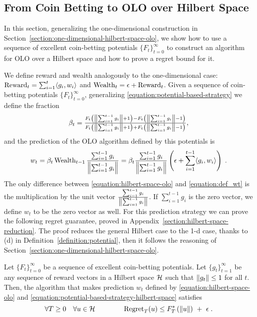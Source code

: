 \subsection{From Coin Betting to OLO over Hilbert Space}
\label{section:reduction_hilbert}

In this section, generalizing the one-dimensional construction in
Section~\ref{section:one-dimensional-hilbert-space-olo}, we show how to use a
sequence of excellent coin-betting potentials $\{F_t\}_{t=0}^\infty$ to
construct an algorithm for \ac{OLO} over a Hilbert space and how to prove a
regret bound for it.

We define reward and wealth analogously to the one-dimensional case:
$\operatorname{Reward}_t = \sum_{i=1}^t \langle g_i, w_i \rangle$ and $\operatorname{Wealth}_t = \epsilon +
\operatorname{Reward}_t$. Given a sequence of coin-betting potentials $\{F_t\}_{t=0}^\infty$,
generalizing \eqref{equation:potential-based-strategy} we define the fraction
\begin{equation}
\label{equation:potential-based-strategy-hilbert-space}
\beta_t
= \tfrac{F_t \left(\left\|{\sum_{i=1}^{t-1} g_i}\right\| + 1\right) - F_t\left(\left\|{\sum_{i=1}^{t-1} g_i}\right\| - 1 \right)}{F_t\left(\left\|{\sum_{i=1}^{t-1} g_i}\right\| + 1 \right) + F_t\left(\left\|{\sum_{i=1}^{t-1} g_i}\right\| - 1 \right)},
\end{equation}
and the prediction of the OLO algorithm defined by this potentials is
\begin{equation}
\label{equation:hilbert-space-olo}
w_t
= \beta_t \operatorname{Wealth}_{t-1} \frac{\sum_{i=1}^{t-1} g_i}{\left\|{\sum_{i=1}^{t-1} g_i}\right\|}
= \beta_t \frac{\sum_{i=1}^{t-1} g_i}{\left\|{\sum_{i=1}^{t-1} g_i}\right\|} \left(\epsilon+ \sum_{i=1}^{t-1} \langle g_i, w_i\rangle \right) \; .
\end{equation}
\vspace{-0.01cm}
The only difference between \eqref{equation:hilbert-space-olo} and
\eqref{equation:def_wt} is the multiplication by the unit vector
$\tfrac{\sum_{i=1}^{t-1} g_i}{\left\|{\sum_{i=1}^{t-1} g_i}\right\|}$. If
$\sum_{i=1}^{t-1} g_i$ is the zero vector, we define $w_t$ to be the zero vector
as well.  For this prediction strategy we can prove the following regret
guarantee, proved in Appendix~\ref{section:hilbert-space-reduction}.  The proof
reduces the general Hilbert case to the 1-d case, thanks to (d) in
Definition~\ref{definition:potential}, then it follows the reasoning of
Section~\ref{section:one-dimensional-hilbert-space-olo}.
%
\begin{theorem}
\label{theorem:hilbert-space-olo-regret-bound}
Let $\{F_t\}_{t=0}^\infty$ be a sequence of excellent coin-betting potentials.
Let $\{g_t\}_{t=1}^\infty$ be any sequence of reward vectors in a Hilbert space
$\mathcal{H}$ such that $\left\|{g_t}\right\| \le 1$ for all $t$. Then, the algorithm that makes
prediction $w_t$ defined by \eqref{equation:hilbert-space-olo} and
\eqref{equation:potential-based-strategy-hilbert-space} satisfies
\[
\forall T \ge 0 \quad
\forall u \in \mathcal{H} \qquad \qquad
\operatorname{Regret}_T(u) \le F_T^*\left(\left\|{u}\right\| \right) \ + \ \epsilon \; .
\]
\end{theorem}
